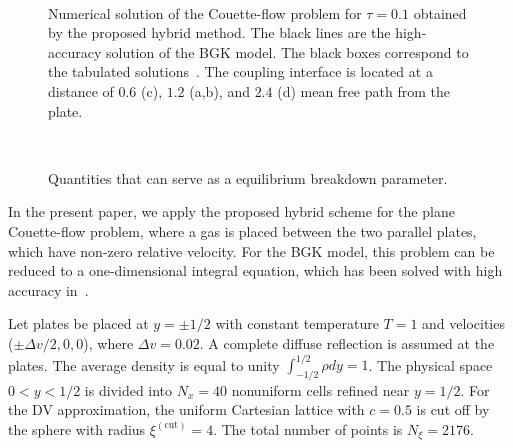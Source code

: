 \documentclass{aip-cp}
\makeatletter
\newenvironment{subfigures}
 {\begin{minipage}{\columnwidth}\def\@captype{figure}\centering}
 {\end{minipage}}
\makeatother
\begin{document}
\begin{figure}
    \begin{subfigures}
    \centering
    \\
    \end{subfigures}
    \caption{
        Numerical solution of the Couette-flow problem for $\tau=0.1$ obtained by the proposed hybrid method.
        The black lines are the high-accuracy solution of the BGK model.
        The black boxes correspond to the tabulated solutions~\cite{Luo2015, Luo2016}.
        The coupling interface is located at a distance of $0.6$ (c),
        $1.2$ (a,b), and $2.4$ (d) mean free path from the plate.
    }\label{fig:hybrid}
\end{figure}

\begin{figure}
    \begin{subfigures}
    \centering
    \\
    \end{subfigures}
    \caption{
        Quantities that can serve as a equilibrium breakdown parameter.
    }\label{fig:norms}
\end{figure}

In the present paper, we apply the proposed hybrid scheme for the plane Couette-flow problem,
where a gas is placed between the two parallel plates, which have non-zero relative velocity.
For the BGK model, this problem can be reduced to a one-dimensional integral equation,
which has been solved with high accuracy in~\cite{Luo2015, Luo2016}.

Let plates be placed at $y = \pm 1/2$ with constant temperature $T = 1$ and velocities ($\pm\Delta v/2,0,0$), where $\Delta v=0.02$.
A complete diffuse reflection is assumed at the plates.
The average density is equal to unity $\int_{-1/2}^{1/2}\rho dy=1$.
The physical space $0 < y < 1/2$ is divided into $N_x = 40$ nonuniform cells refined near $y = 1/2$.
For the DV approximation, the uniform Cartesian lattice with $c=0.5$ is cut off by the sphere with radius $\xi^{(\mathrm{cut})}=4$.
The total number of points is $N_\xi=2176$.
\end{document}
